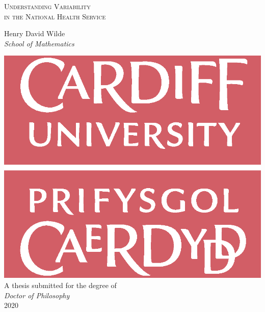 \begin{titlepage}
    \begin{center}
        
    \vspace*{2em}
    
    \textsc{\Huge{%
        Understanding Variability \\
        in the National Health Service\\
    }}

    \vspace{4em}
    \huge{%
        Henry David Wilde\\
        \textit{School of Mathematics}\\[1ex]
    }

    \vfill

    \includegraphics[width=.3\linewidth]{logo.eps}\\[1ex]

    \vfill
    \huge{%
        A thesis submitted for the degree of\\
        \textit{Doctor of Philosophy}\\[2em]
        2020
    }
    \end{center}
\end{titlepage}
